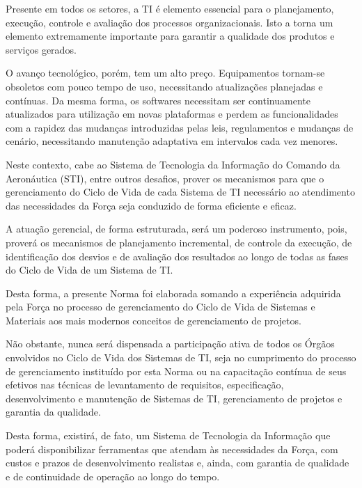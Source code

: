Presente em todos os setores, a TI é elemento essencial para o planejamento, execução, controle e avaliação dos processos organizacionais. Isto a torna um elemento extremamente importante para garantir a qualidade dos produtos e serviços gerados.

O avanço tecnológico, porém, tem um alto preço. Equipamentos tornam-se obsoletos com pouco tempo de uso, necessitando atualizações planejadas e contínuas. Da mesma forma, os softwares necessitam ser continuamente atualizados para utilização em novas plataformas e perdem as funcionalidades com a rapidez das mudanças introduzidas pelas leis, regulamentos e mudanças de cenário, necessitando manutenção adaptativa em intervalos cada vez menores.

Neste contexto, cabe ao Sistema de Tecnologia da Informação do Comando da Aeronáutica (STI), entre outros desafios, prover os mecanismos para que o gerenciamento do Ciclo de Vida de cada Sistema de TI necessário ao atendimento das necessidades da Força seja conduzido de forma eficiente e eficaz.

A atuação gerencial, de forma estruturada, será um poderoso instrumento, pois, proverá os mecanismos de planejamento incremental, de controle da execução, de identificação dos desvios e de avaliação dos resultados ao longo de todas as fases do Ciclo de Vida de um Sistema de TI.

Desta forma, a presente Norma foi elaborada somando a experiência adquirida pela Força no processo de gerenciamento do Ciclo de Vida de Sistemas e Materiais aos mais modernos conceitos de gerenciamento de projetos.

Não obstante, nunca será dispensada a participação ativa de todos os Órgãos envolvidos no Ciclo de Vida dos Sistemas de TI, seja no cumprimento do processo de gerenciamento instituído por esta Norma ou na capacitação contínua de seus efetivos nas técnicas de levantamento de requisitos, especificação, desenvolvimento e manutenção de Sistemas de TI, gerenciamento de projetos e garantia da qualidade.

Desta forma, existirá, de fato, um Sistema de Tecnologia da Informação que poderá disponibilizar ferramentas que atendam às necessidades da Força, com custos e prazos de desenvolvimento realistas e, ainda, com garantia de qualidade e de continuidade de operação ao longo do tempo.